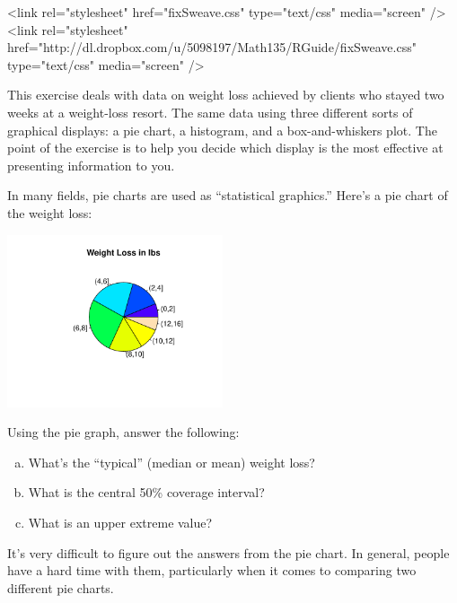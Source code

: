 



\providecommand{\HCode}[1]{#1} %
\HCode{<link rel="stylesheet" href="fixSweave.css" type="text/css"
  media="screen" />}
\HCode{<link rel="stylesheet" href="http://dl.dropbox.com/u/5098197/Math135/RGuide/fixSweave.css" type="text/css"
 media="screen" />}

This exercise 
deals with data on weight loss achieved by clients who stayed two weeks
at a weight-loss resort.  The same data  using 
three different
sorts of graphical displays:
a pie chart, a histogram, and a box-and-whiskers plot.  The point of
the exercise is to help you decide which display is the most
effective at presenting information to you. 

In many fields, pie charts are used as ``statistical graphics.''
Here's a pie chart of the weight loss:


\centerline{\includegraphics[width=2.5in,trim=35 20 25 0]{Figures/S2008-var2-pie}}



Using the pie graph, answer the following:
\begin{enumerate}[(a)]
\item What's the ``typical'' (median or mean) weight loss?
\item What is the central 50\% coverage interval?\\
\item What is an upper extreme value?
\end{enumerate}

\begin{AnswerText}
It's very difficult to figure out the answers from the pie chart.
In general, people have a hard time with them, particularly when it
comes to comparing two different pie charts.
\end{AnswerText}

